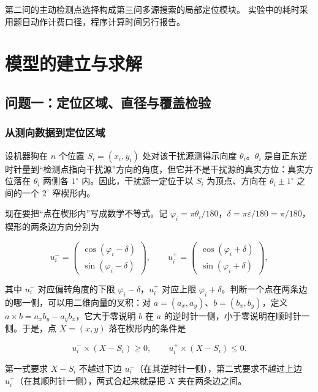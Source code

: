 \documentclass[UTF8,a4paper,zihao=5,fontset=fandol]{ctexart}
\begin{document}
第二问的主动检测点选择构成第三问多源搜索的局部定位模块。
实验中的耗时采用题目动作计费口径，程序计算时间另行报告。


\section{模型的建立与求解}\label{sec:models}


\subsection{问题一：定位区域、直径与覆盖检验}\label{sec:q1}
\subsubsection{从测向数据到定位区域}\label{sec:q1-1}

设机器狗在 $n$ 个位置 $S_i=(x_i,y_i)$ 处对该干扰源测得示向度 $\theta_i$。$\theta_i$ 是自正东逆时针量到“检测点指向干扰源”方向的角度，但它并不是干扰源的真实方位：真实方位落在 $\theta_i$ 两侧各 $1^\circ$ 内。因此，干扰源一定位于以 $S_i$ 为顶点、方向在 $\theta_i\pm1^\circ$ 之间的一个 $2^\circ$ 窄楔形内。

现在要把“点在楔形内”写成数学不等式。记 $\varphi_i=\pi\theta_i/180$，$\delta=\pi\varepsilon/180=\pi/180$，楔形的两条边方向分别为

\[
u_i^-=\begin{pmatrix}\cos(\varphi_i-\delta)\\ \sin(\varphi_i-\delta)\end{pmatrix},\qquad
u_i^+=\begin{pmatrix}\cos(\varphi_i+\delta)\\ \sin(\varphi_i+\delta)\end{pmatrix},
\]

其中 $u_i^-$ 对应偏转角度的下限 $\varphi_i-\delta$，$u_i^+$ 对应上限 $\varphi_i+\delta$。判断一个点在两条边的哪一侧，可以用二维向量的叉积：对 $a=(a_x,a_y)$、$b=(b_x,b_y)$，定义 $a\times b=a_xb_y-a_yb_x$，它大于零说明 $b$ 在 $a$ 的逆时针一侧，小于零说明在顺时针一侧。于是，点 $X=(x,y)$ 落在楔形内的条件是

\begin{equation}\label{eq:q1-1}
u_i^-\times(X-S_i)\ge 0,\qquad u_i^+\times(X-S_i)\le 0.
\end{equation}

第一式要求 $X-S_i$ 不越过下边 $u_i^-$（在其逆时针一侧），第二式要求不越过上边 $u_i^+$（在其顺时针一侧），两式合起来就是把 $X$ 夹在两条边之间。
\end{document}
